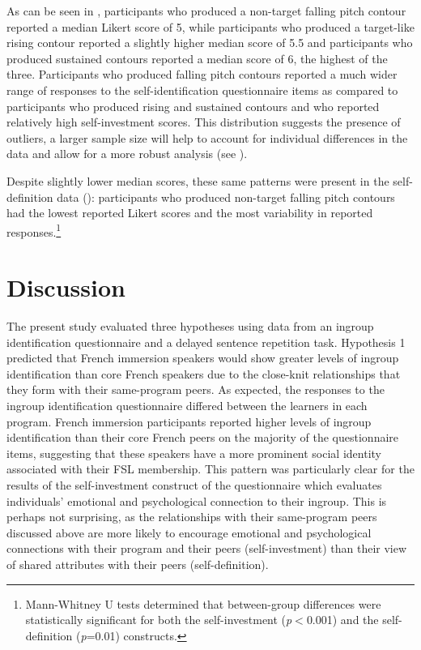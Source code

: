 \documentclass[output=paper,colorlinks,citecolor=brown,draftmode]{langscibook}
\begin{document}
As can be seen in , participants who produced a non-target falling pitch contour reported a median Likert score of 5, while participants who produced a target-like rising contour reported a slightly higher median score of 5.5 and participants who produced sustained contours reported a median score of 6, the highest of the three. Participants who produced falling pitch contours reported a much wider range of responses to the self-identification questionnaire items as compared to participants who produced rising and sustained contours and who reported relatively high self-investment scores. This distribution suggests the presence of outliers, a larger sample size will help to account for individual differences in the data and allow for a more robust analysis (see ).


Despite slightly lower median scores, these same patterns were present in the self-definition data (): participants who produced non-target falling pitch contours had the lowest reported Likert scores and the most variability in reported responses.\footnote{Mann-Whitney U tests determined that between-group differences were statistically significant for both the self-investment (\textit{p}$<$0.001) and the self-definition (\textit{p}=0.01) constructs.}

\section{Discussion}\label{sec:11:5}

The present study evaluated three hypotheses using data from an ingroup identification questionnaire and a delayed sentence repetition task. Hypothesis 1 predicted that French immersion speakers would show greater levels of ingroup identification than core French speakers due to the close-knit relationships that they form with their same-program peers. As expected, the responses to the ingroup identification questionnaire differed between the learners in each program. French immersion participants reported higher levels of ingroup identification than their core French peers on the majority of the questionnaire items, suggesting that these speakers have a more prominent social identity associated with their FSL membership. This pattern was particularly clear for the results of the self-investment construct of the questionnaire which evaluates individuals’ emotional and psychological connection to their ingroup. This is perhaps not surprising, as the relationships with their same-program peers discussed above are more likely to encourage emotional and psychological connections with their program and their peers (self-investment) than their view of shared attributes with their peers (self-definition).
\end{document}
